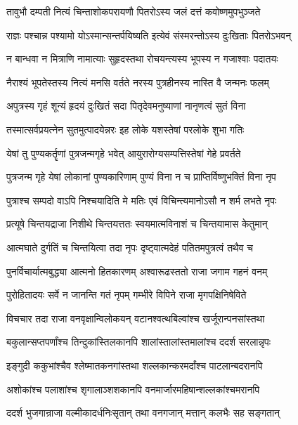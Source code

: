 \twolineshloka
{तावुभौ दम्पती नित्यं चिन्ताशोकपरायणौ}
{पितरोऽस्य जलं दत्तं कवोष्णमुपभुञ्जते}%

\twolineshloka
{राज्ञः पश्चान्न पश्यामो योऽस्मान्सन्तर्पयिष्यति}
{इत्येवं संस्मरन्तोऽस्य दुःखिताः पितरोऽभवन्}%

\twolineshloka
{न बान्धवा न मित्राणि नामात्याः सुहृदस्तथा}
{रोचयन्त्यस्य भूपस्य न गजाश्वाः पदातयः}%

\twolineshloka
{नैराश्यं भूपतेस्तस्य नित्यं मनसि वर्तते}
{नरस्य पुत्रहीनस्य नास्ति वै जन्मनः फलम्}%

\twolineshloka
{अपुत्रस्य गृहं शून्यं हृदयं दुःखितं सदा}
{पितृदेवमनुष्याणां नानृणत्वं सुतं विना}%

\twolineshloka
{तस्मात्सर्वप्रयत्नेन सुतमुत्पादयेन्नरः}
{इह लोके यशस्तेषां परलोके शुभा गतिः}%

\twolineshloka
{येषां तु पुण्यकर्तॄणां पुत्रजन्मगृहे भवेत्}
{आयुरारोग्यसम्पत्तिस्तेषां गेहे प्रवर्तते}%

\twolineshloka
{पुत्रजन्म गृहे येषां लोकानां पुण्यकारिणाम्}
{पुण्यं विना न च प्राप्तिर्विष्णुभक्तिं विना नृप}%

\twolineshloka
{पुत्राश्च सम्पदो वाऽपि निश्चयादिति मे मतिः}
{एवं विचिन्त्यमानोऽसौ न शर्म लभते नृपः}%

\twolineshloka
{प्रत्यूषे चिन्तयद्राजा निशीथे चिन्तयत्ततः}
{स्वयमात्मविनाशं च चिन्तयामास केतुमान्}%

\twolineshloka
{आत्मघाते दुर्गतिं च चिन्तयित्वा तदा नृपः}
{दृष्ट्वात्मदेहं पतितमपुत्रत्वं तथैव च}%

\twolineshloka
{पुनर्विचार्यात्मबुद्ध्या आत्मनो हितकारणम्}
{अश्वारूढस्ततो राजा जगाम गहनं वनम्}%

\twolineshloka
{पुरोहितादयः सर्वे न जानन्ति गतं नृपम्}
{गम्भीरे विपिने राजा मृगपक्षिनिषेविते}%

\twolineshloka
{विचचार तदा राजा वनवृक्षान्विलोकयन्}
{वटानश्वत्थबिल्वांश्च खर्जूरान्पनसांस्तथा}%

\twolineshloka
{बकुलान्सप्तपर्णांश्च तिन्दुकांस्तिलकानपि}
{शालांस्तालांस्तमालांश्च ददर्श सरलान्नृपः}%

\twolineshloka
{इङ्गुदी ककुभांश्चैव श्लेष्मातकनगांस्तथा}
{शल्लकान्करमर्दांश्च पाटलान्बदरानपि}%

\twolineshloka
{अशोकांश्च पलाशांश्च शृगालाञ्शशकानपि}
{वनमार्जारमहिषान्शल्लकांश्चमरानपि}%

\twolineshloka
{ददर्श भुजगान्राजा वल्मीकादर्धनिःसृतान्}
{तथा वनगजान् मत्तान् कलभैः सह सङ्गतान्}%

